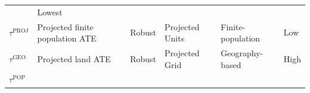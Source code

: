 \documentclass[letter]{article}
\newcommand{\tauproj}{\tau^{\mathrm{PROJ}}}
\newcommand{\taugeo}{\tau^{\mathrm{GEO}}}
\newcommand{\taupop}{\tau^{\mathrm{POP}}}
\begin{document}
\begin{longtable}[]{@{}llllll@{}}
\begin{minipage}[t]{0.15\columnwidth}
\end{minipage} & \begin{minipage}[t]{0.08\columnwidth}\raggedright\strut
Lowest\strut
\end{minipage}\tabularnewline
\begin{minipage}[t]{0.09\columnwidth}\raggedright\strut
\(\tauproj\)\strut
\end{minipage} & \begin{minipage}[t]{0.25\columnwidth}\raggedright\strut
Projected finite population ATE\strut
\end{minipage} & \begin{minipage}[t]{0.13\columnwidth}\raggedright\strut
Robust\strut
\end{minipage} & \begin{minipage}[t]{0.13\columnwidth}\raggedright\strut
Projected Units\strut
\end{minipage} & \begin{minipage}[t]{0.15\columnwidth}\raggedright\strut
Finite-population\strut
\end{minipage} & \begin{minipage}[t]{0.08\columnwidth}\raggedright\strut
Low\strut
\end{minipage}\tabularnewline
\begin{minipage}[t]{0.09\columnwidth}\raggedright\strut
\(\taugeo\)\strut
\end{minipage} & \begin{minipage}[t]{0.25\columnwidth}\raggedright\strut
Projected land ATE\strut
\end{minipage} & \begin{minipage}[t]{0.13\columnwidth}\raggedright\strut
Robust\strut
\end{minipage} & \begin{minipage}[t]{0.13\columnwidth}\raggedright\strut
Projected Grid\strut
\end{minipage} & \begin{minipage}[t]{0.15\columnwidth}\raggedright\strut
Geography-based\strut
\end{minipage} & \begin{minipage}[t]{0.08\columnwidth}\raggedright\strut
High\strut
\end{minipage}\tabularnewline
\begin{minipage}[t]{0.09\columnwidth}\raggedright\strut
\(\taupop\)\strut
\end{minipage} & \begin{minipage}[t]{0.25\columnwidth}\raggedright\strut

\end{minipage}
\end{longtable}
\end{document}

